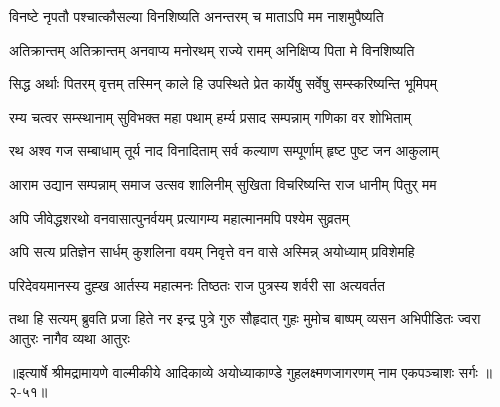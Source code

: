 \twolineshloka
{विनष्टे नृपतौ पश्चात्कौसल्या विनशिष्यति}
{अनन्तरम् च माताऽपि मम नाशमुपैष्यति} %

\twolineshloka
{अतिक्रान्तम् अतिक्रान्तम् अनवाप्य मनोरथम्}
{राज्ये रामम् अनिक्षिप्य पिता मे विनशिष्यति} %

\twolineshloka
{सिद्ध अर्थाः पितरम् वृत्तम् तस्मिन् काले हि उपस्थिते}
{प्रेत कार्येषु सर्वेषु सम्स्करिष्यन्ति भूमिपम्} %

\twolineshloka
{रम्य चत्वर सम्स्थानाम् सुविभक्त महा पथाम्}
{हर्म्य प्रसाद सम्पन्नाम् गणिका वर शोभिताम्} %

\twolineshloka
{रथ अश्व गज सम्बाधाम् तूर्य नाद विनादिताम्}
{सर्व कल्याण सम्पूर्णाम् हृष्ट पुष्ट जन आकुलाम्} %

\twolineshloka
{आराम उद्यान सम्पन्नाम् समाज उत्सव शालिनीम्}
{सुखिता विचरिष्यन्ति राज धानीम् पितुर् मम} %

\twolineshloka
{अपि जीवेद्धशरथो वनवासात्पुनर्वयम्}
{प्रत्यागम्य महात्मानमपि पश्येम सुव्रतम्} %

\twolineshloka
{अपि सत्य प्रतिज्ञेन सार्धम् कुशलिना वयम्}
{निवृत्ते वन वासे अस्मिन्न् अयोध्याम् प्रविशेमहि} %

\twolineshloka
{परिदेवयमानस्य दुह्ख आर्तस्य महात्मनः}
{तिष्ठतः राज पुत्रस्य शर्वरी सा अत्यवर्तत} %

\fourlineindentedshloka
{तथा हि सत्यम् ब्रुवति प्रजा हिते}
{नर इन्द्र पुत्रे गुरु सौहृदात् गुहः}
{मुमोच बाष्पम् व्यसन अभिपीडितः}
{ज्वरा आतुरः नागैव व्यथा आतुरः} %


॥इत्यार्षे श्रीमद्रामायणे वाल्मीकीये आदिकाव्ये अयोध्याकाण्डे गुहलक्ष्मणजागरणम् नाम एकपञ्चाशः सर्गः ॥२-५१॥
